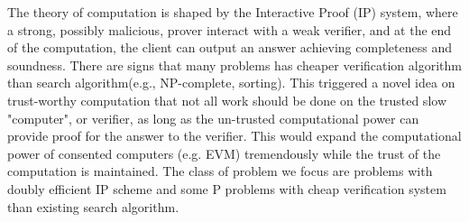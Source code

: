 
The theory of computation is shaped by the Interactive Proof (IP) system\cite{GMR}, where a strong, possibly malicious, prover interact with a weak verifier, and at the end of the computation, the client can output an answer achieving completeness and soundness. There are signs that many problems has cheaper verification algorithm than search algorithm(e.g., NP-complete, sorting). This triggered a novel idea on trust-worthy computation that not all work should be done on the trusted slow "computer", or verifier, as long as the un-trusted computational power can provide proof for the answer to the verifier. This would expand the computational power of consented computers (e.g. EVM) tremendously while the trust of the computation is maintained. The class of problem we focus  are problems with doubly efficient IP scheme\cite{ip_muggles}\cite{goldreich_doubly_efficient_ip} and some P problems with cheap verification system than existing search algorithm.\\


